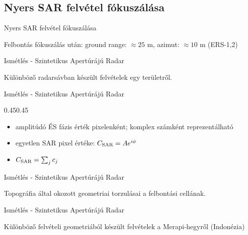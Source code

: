 \documentclass[aspectratio=169]{beamer}
\begin{document}
\def\ft{Nyers SAR felvétel fókuszálása}
\subsection{\ft}

\begin{frame}{\ft}
    \begin{minic}{0.75}
        
        \centering
        Felbontás fókuszálás után: ground range: $\approx 25$ m, azimut: $\approx 10$ m (ERS-1,2)
    \end{minic}
\end{frame}


\def\ft{Ismétlés - Szintetikus Apertúrájú Radar}

\begin{frame}{\ft}
    \begin{minic}{0.85}
        
        \centering
        Különböző radarsávban készült felvételek egy területről.
    \end{minic}
\end{frame}


\begin{frame}{\ft}
    \begin{figp}{}{}{0.45}{0.45}
        \begin{itemize}
            \item amplitúdó ÉS fázis érték pixelenként; komplex számként reprezentálható
            \item egyetlen SAR pixel értéke: $C_{\text{SAR}} = A e^{i\phi}$
            \item $C_{\text{SAR}} = \sum_j c_j$
        \end{itemize}
    \end{figp}
\end{frame}


\begin{frame}{\ft}
    \begin{minic}{0.64}
        \centering
        
        Topográfia által okozott geometriai torzulásai a felbontási cellának.
    \end{minic}
\end{frame}


\begin{frame}{\ft}
    \begin{minic}{0.85}
        \centering
        
        Különböző felvételi geometriából készült felvételek a Merapi-hegyről (Indonézia)
    \end{minic}
\end{frame}
\end{document}
